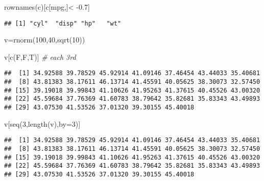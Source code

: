 \documentclass[]{article}
\newenvironment{Shaded}{\begin{snugshade}}{\end{snugshade}}
\newcommand{\AttributeTok}[1]{\textcolor[rgb]{0.77,0.63,0.00}{#1}}
\newcommand{\CommentTok}[1]{\textcolor[rgb]{0.56,0.35,0.01}{\textit{#1}}}
\newcommand{\DecValTok}[1]{\textcolor[rgb]{0.00,0.00,0.81}{#1}}
\newcommand{\FloatTok}[1]{\textcolor[rgb]{0.00,0.00,0.81}{#1}}
\newcommand{\FunctionTok}[1]{\textcolor[rgb]{0.00,0.00,0.00}{#1}}
\newcommand{\NormalTok}[1]{#1}
\newcommand{\OtherTok}[1]{\textcolor[rgb]{0.56,0.35,0.01}{#1}}
\newcommand{\SpecialCharTok}[1]{\textcolor[rgb]{0.00,0.00,0.00}{#1}}
\newcommand{\StringTok}[1]{\textcolor[rgb]{0.31,0.60,0.02}{#1}}
\begin{document}
\begin{Shaded}
\begin{Highlighting}[]
\FunctionTok{rownames}\NormalTok{(c)[c[}\StringTok{\textquotesingle{}mpg\textquotesingle{}}\NormalTok{,]}\SpecialCharTok{\textless{}} \SpecialCharTok{{-}}\FloatTok{0.7}\NormalTok{]}
\end{Highlighting}
\end{Shaded}

\begin{verbatim}
## [1] "cyl"  "disp" "hp"   "wt"
\end{verbatim}

\begin{Shaded}
\begin{Highlighting}[]
\NormalTok{v}\OtherTok{=}\FunctionTok{rnorm}\NormalTok{(}\DecValTok{100}\NormalTok{,}\DecValTok{40}\NormalTok{,}\FunctionTok{sqrt}\NormalTok{(}\DecValTok{10}\NormalTok{))}

\NormalTok{v[}\FunctionTok{c}\NormalTok{(F,F,T)] }\CommentTok{\# each 3rd}
\end{Highlighting}
\end{Shaded}

\begin{verbatim}
##  [1] 34.92588 39.78529 45.92914 41.09146 37.46454 43.44033 35.40681
##  [8] 43.81383 38.17611 46.13714 41.45591 40.05625 38.30073 32.57450
## [15] 39.19018 39.99843 41.10626 41.95263 41.37615 40.45526 43.00320
## [22] 45.59684 37.76369 41.60783 38.79642 35.82681 35.83343 43.49893
## [29] 43.07530 41.53526 37.01320 39.30155 45.40018
\end{verbatim}

\begin{Shaded}
\begin{Highlighting}[]
\NormalTok{v[}\FunctionTok{seq}\NormalTok{(}\DecValTok{3}\NormalTok{,}\FunctionTok{length}\NormalTok{(v),}\AttributeTok{by=}\DecValTok{3}\NormalTok{)]}
\end{Highlighting}
\end{Shaded}

\begin{verbatim}
##  [1] 34.92588 39.78529 45.92914 41.09146 37.46454 43.44033 35.40681
##  [8] 43.81383 38.17611 46.13714 41.45591 40.05625 38.30073 32.57450
## [15] 39.19018 39.99843 41.10626 41.95263 41.37615 40.45526 43.00320
## [22] 45.59684 37.76369 41.60783 38.79642 35.82681 35.83343 43.49893
## [29] 43.07530 41.53526 37.01320 39.30155 45.40018
\end{verbatim}
\end{document}

